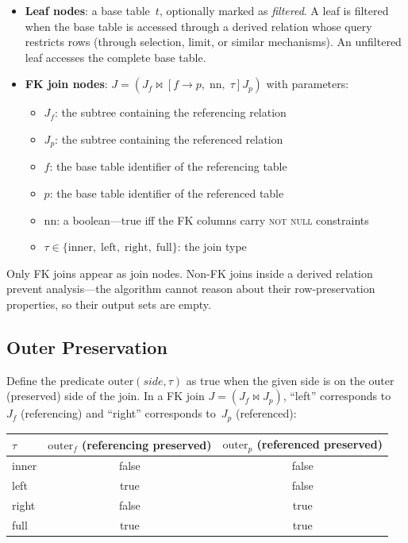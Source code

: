 \documentclass[11pt]{article}
\theoremstyle{definition}
\newcommand{\joins}{\bowtie}
\newcommand{\fkjoin}[1]{\joins\![#1]}
\newcommand{\Jf}{J_f}
\newcommand{\Jp}{J_p}
\newcommand{\outerf}{\mathrm{outer}_f}
\newcommand{\outerp}{\mathrm{outer}_p}
\newcommand{\nn}{\mathrm{nn}}
\begin{document}
\begin{itemize}
\item \textbf{Leaf nodes}: a base table~$t$, optionally marked as
  \emph{filtered}.  A leaf is filtered when the base table is
  accessed through a derived relation whose query restricts rows
  (through selection, limit, or similar mechanisms).  An unfiltered
  leaf accesses the complete base table.

\item \textbf{FK join nodes}:
  $J = (\Jf \fkjoin{f \to p,\;\nn,\;\tau} \Jp)$ with parameters:
  \begin{itemize}[nosep]
  \item $\Jf$: the subtree containing the referencing relation
  \item $\Jp$: the subtree containing the referenced relation
  \item $f$: the base table identifier of the referencing table
  \item $p$: the base table identifier of the referenced table
  \item $\nn$: a boolean---true iff the FK columns carry
    \textsc{not null} constraints
  \item $\tau \in
    \{\text{inner},\;\text{left},\;\text{right},\;\text{full}\}$:
    the join type
  \end{itemize}
\end{itemize}

Only FK joins appear as join nodes.  Non-FK joins inside a derived
relation prevent analysis---the algorithm cannot reason about their
row-preservation properties, so their output sets are empty.


\subsection{Outer Preservation}

Define the predicate $\mathrm{outer}(\mathit{side}, \tau)$ as true
when the given side is on the outer (preserved) side of the join.  In
a FK join $J = (\Jf \joins \Jp)$, ``left'' corresponds to~$\Jf$
(referencing) and ``right'' corresponds to~$\Jp$ (referenced):

\begin{center}
\begin{tabular}{lcc}
\toprule
$\tau$ & $\outerf$ (referencing preserved)
       & $\outerp$ (referenced preserved) \\
\midrule
inner & false & false \\
left  & true  & false \\
right & false & true  \\
full  & true  & true  \\
\bottomrule
\end{tabular}
\end{center}
\end{document}

